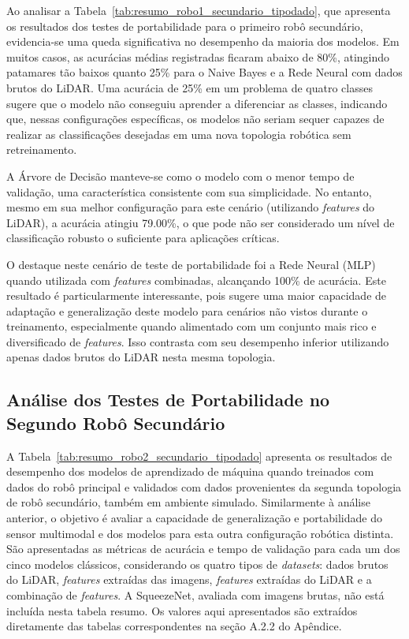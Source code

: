 Ao analisar a Tabela~\ref{tab:resumo_robo1_secundario_tipodado}, que apresenta os resultados dos testes de portabilidade para o primeiro robô secundário, evidencia-se uma queda significativa no desempenho da maioria dos modelos. Em muitos casos, as acurácias médias registradas ficaram abaixo de 80\%, atingindo patamares tão baixos quanto 25\% para o Naive Bayes e a Rede Neural com dados brutos do LiDAR. Uma acurácia de 25\% em um problema de quatro classes sugere que o modelo não conseguiu aprender a diferenciar as classes, indicando que, nessas configurações específicas, os modelos não seriam sequer capazes de realizar as classificações desejadas em uma nova topologia robótica sem retreinamento.

A Árvore de Decisão manteve-se como o modelo com o menor tempo de validação, uma característica consistente com sua simplicidade. No entanto, mesmo em sua melhor configuração para este cenário (utilizando \textit{features} do LiDAR), a acurácia atingiu 79.00\%, o que pode não ser considerado um nível de classificação robusto o suficiente para aplicações críticas.

O destaque neste cenário de teste de portabilidade foi a Rede Neural (MLP) quando utilizada com \textit{features} combinadas, alcançando 100\% de acurácia. Este resultado é particularmente interessante, pois sugere uma maior capacidade de adaptação e generalização deste modelo para cenários não vistos durante o treinamento, especialmente quando alimentado com um conjunto mais rico e diversificado de \textit{features}. Isso contrasta com seu desempenho inferior utilizando apenas dados brutos do LiDAR nesta mesma topologia.

\subsection{Análise dos Testes de Portabilidade no Segundo Robô Secundário}

A Tabela~\ref{tab:resumo_robo2_secundario_tipodado} apresenta os resultados de desempenho dos modelos de aprendizado de máquina quando treinados com dados do robô principal e validados com dados provenientes da segunda topologia de robô secundário, também em ambiente simulado. Similarmente à análise anterior, o objetivo é avaliar a capacidade de generalização e portabilidade do sensor multimodal e dos modelos para esta outra configuração robótica distinta. São apresentadas as métricas de acurácia e tempo de validação para cada um dos cinco modelos clássicos, considerando os quatro tipos de \textit{datasets}: dados brutos do LiDAR, \textit{features} extraídas das imagens, \textit{features} extraídas do LiDAR e a combinação de \textit{features}. A SqueezeNet, avaliada com imagens brutas, não está incluída nesta tabela resumo. Os valores aqui apresentados são extraídos diretamente das tabelas correspondentes na seção A.2.2 do Apêndice.

